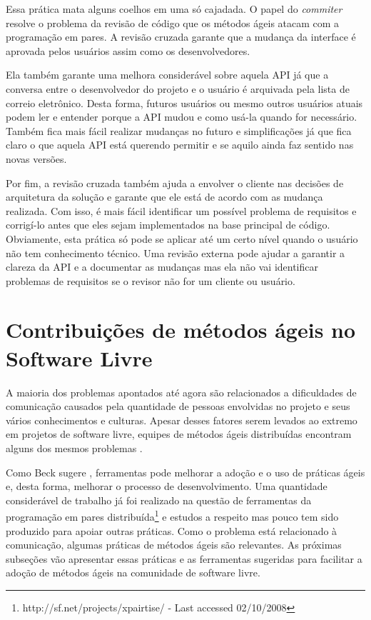 Essa prática mata alguns coelhos em uma só cajadada. O papel do
\emph{commiter} resolve o problema da revisão de código que os métodos
ágeis atacam com a programação em pares. A revisão cruzada garante que
a mudança da interface é aprovada pelos usuários assim como os
desenvolvedores.

Ela também garante uma melhora considerável sobre aquela API já que a
conversa entre o desenvolvedor do projeto e o usuário é arquivada pela
lista de correio eletrônico. Desta forma, futuros usuários ou mesmo
outros usuários atuais podem ler e entender porque a API mudou e como
usá-la quando for necessário. Também fica mais fácil realizar mudanças
no futuro e simplificações já que fica claro o que aquela API está
querendo permitir e se aquilo ainda faz sentido nas novas versões.

Por fim, a revisão cruzada também ajuda a envolver o cliente nas
decisões de arquitetura da solução e garante que ele está de acordo
com as mudança realizada. Com isso, é mais fácil identificar um
possível problema de requisitos e corrigí-lo antes que eles sejam
implementados na base principal de código. Obviamente, esta prática só
pode se aplicar até um certo nível quando o usuário não tem
conhecimento técnico. Uma revisão externa pode ajudar a garantir a
clareza da API e a documentar as mudanças mas ela não vai identificar
problemas de requisitos se o revisor não for um cliente ou usuário.

\section{Contribuições de métodos ágeis no Software Livre}
\label{sec:agile-improve-os}

A maioria dos problemas apontados até agora são relacionados a
dificuldades de comunicação causados pela quantidade de pessoas
envolvidas no projeto e seus vários conhecimentos e culturas. Apesar
desses fatores serem levados ao extremo em projetos de software livre,
equipes de métodos ágeis distribuídas encontram alguns dos mesmos
problemas \cite{Sutherland2007,Maurer2002}.

Como Beck sugere \cite{Beck2008}, ferramentas pode melhorar a adoção e
o uso de práticas ágeis e, desta forma, melhorar o processo de
desenvolvimento. Uma quantidade considerável de trabalho já foi
realizado na questão de ferramentas da programação em pares
distribuída\footnote{http://sf.net/projects/xpairtise/ - Last accessed
  02/10/2008} e estudos a respeito \cite{Nagappan2003} mas pouco tem
sido produzido para apoiar outras práticas. Como o problema está
relacionado à comunicação, algumas práticas de métodos ágeis são
relevantes. As próximas subseções vão apresentar essas práticas e as
ferramentas sugeridas para facilitar a adoção de métodos ágeis na
comunidade de software livre.

